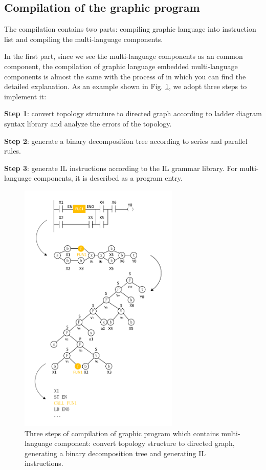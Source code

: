 \documentclass[journal,UTF8]{IEEEtran}
\begin{document}
 \subsection{Compilation of the graphic program}
The compilation contains two parts: compiling graphic language into instruction list and compiling the multi-language components.
 	
  In the first part, since we see the multi-language components as an common component, the compilation of graphic language embedded multi-language components is almost the same with the process of \cite{Yan2010Compiling} in which you can find the detailed explanation. As an example shown in Fig. \ref{fig:Compile}, we adopt three steps to implement it:
 	
 \textbf{Step 1}: convert topology structure to directed graph according to ladder diagram syntax library and analyze the errors of the topology.
 	
 \textbf{Step 2}: generate a binary decomposition tree according to series and parallel rules.
 	
 \textbf{Step 3}: generate IL instructions according to the IL grammar library. For multi-language components, it is described as a program entry.
 
 \begin{figure}
 	\centering
 	\includegraphics[width=3in]{fig/Compile.pdf}
 	\caption{Three steps of compilation of graphic program which contains multi-language component: convert topology structure to directed graph, generating a binary decomposition tree and generating IL instructions.}
 	\label{fig:Compile}
 \end{figure}
 
\end{document}
